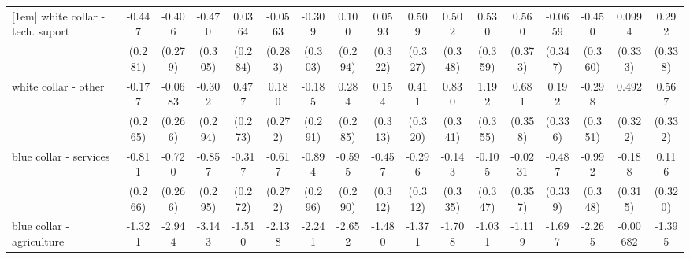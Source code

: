 {\begin{tabular}{l*{16}{c}}
[1em]
white collar - tech. suport&      -0.447         &      -0.406         &      -0.470         &      0.0364         &     -0.0563         &      -0.309         &       0.100         &      0.0593         &       0.509         &       0.502         &       0.530         &       0.560         &     -0.0659         &      -0.450         &      0.0994         &       0.292         \\
                    &     (0.281)         &     (0.279)         &     (0.305)         &     (0.284)         &     (0.283)         &     (0.303)         &     (0.294)         &     (0.322)         &     (0.327)         &     (0.348)         &     (0.359)         &     (0.373)         &     (0.347)         &     (0.360)         &     (0.333)         &     (0.338)         \\
[1em]
white collar - other&      -0.177         &     -0.0683         &      -0.302         &       0.477         &       0.180         &      -0.185         &       0.284         &       0.154         &       0.411         &       0.830\sym{*}  &       1.192\sym{***}&       0.681         &       0.192         &      -0.298         &       0.492         &       0.567         \\
                    &     (0.265)         &     (0.266)         &     (0.294)         &     (0.273)         &     (0.272)         &     (0.291)         &     (0.285)         &     (0.313)         &     (0.320)         &     (0.341)         &     (0.355)         &     (0.358)         &     (0.336)         &     (0.351)         &     (0.322)         &     (0.332)         \\
[1em]
blue collar - services&      -0.811\sym{**} &      -0.720\sym{**} &      -0.857\sym{**} &      -0.317         &      -0.617\sym{*}  &      -0.894\sym{**} &      -0.595\sym{*}  &      -0.457         &      -0.296         &      -0.143         &      -0.105         &     -0.0231         &      -0.487         &      -0.992\sym{**} &      -0.188         &       0.116         \\
                    &     (0.266)         &     (0.266)         &     (0.295)         &     (0.272)         &     (0.272)         &     (0.296)         &     (0.290)         &     (0.312)         &     (0.312)         &     (0.335)         &     (0.347)         &     (0.357)         &     (0.339)         &     (0.348)         &     (0.315)         &     (0.320)         \\
[1em]
blue collar - agriculture&      -1.321         &      -2.944\sym{***}&      -3.143\sym{**} &      -1.510         &      -2.138\sym{*}  &      -2.241\sym{**} &      -2.652\sym{**} &      -1.480         &      -1.371         &      -1.708\sym{*}  &      -1.031         &      -1.119         &      -1.697         &      -2.265\sym{**} &    -0.00682         &      -1.395         \\

\end{tabular}}

